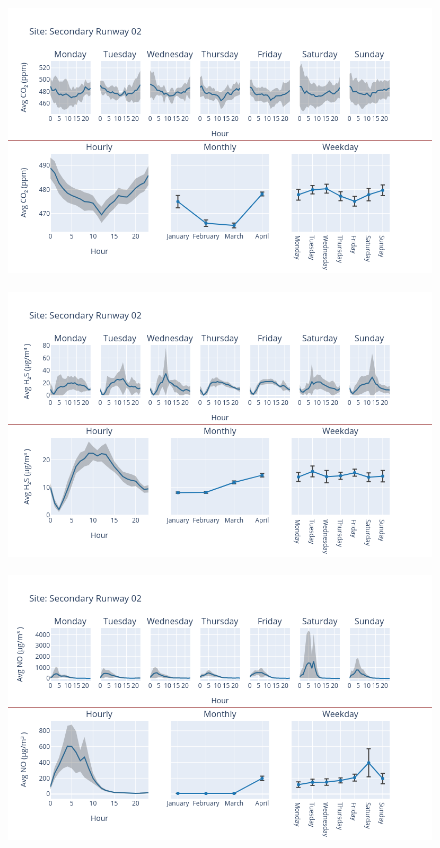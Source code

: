 \documentclass[12pt, oneside]{book}
\begin{document}
{ 
{\begin{figure}[H] 
 \centering 
\includegraphics[width=.88\textwidth, keepaspectratio]{image176} 
 \end{figure}}{} 

{\begin{figure}[H] 
 \centering 
\includegraphics[width=.88\textwidth, keepaspectratio]{image177} 
 \end{figure}}{} 

{\begin{figure}[H] 
 \centering 
\includegraphics[width=.88\textwidth, keepaspectratio]{image178} 
 \end{figure}}{} 

}
\end{document}
